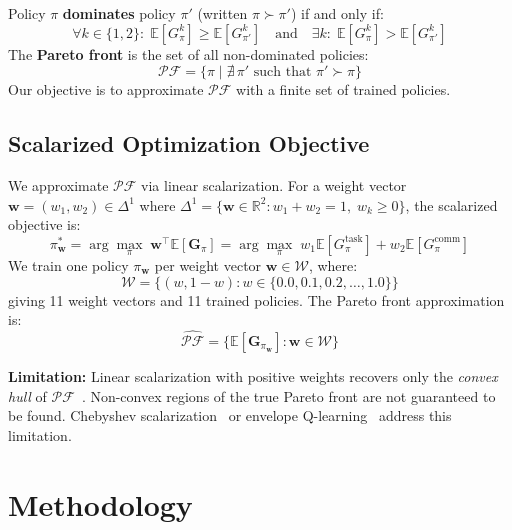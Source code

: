 \documentclass[runningheads]{llncs}
\newcommand{\E}{\mathbb{E}}
\newcommand{\R}{\mathbb{R}}
\newcommand{\PF}{\mathcal{PF}}
\newcommand{\W}{\mathcal{W}}
\newcommand{\bw}{\mathbf{w}}
\newcommand{\bG}{\mathbf{G}}
\begin{document}
Policy $\pi$ \textbf{dominates} policy $\pi'$ (written $\pi \succ \pi'$)
if and only if:
\begin{equation}
  \forall k \in \{1,2\}:\; \E[G^k_\pi] \geq \E[G^k_{\pi'}]
  \quad \text{and} \quad
  \exists k:\; \E[G^k_\pi] > \E[G^k_{\pi'}]
  \label{eq:dominance}
\end{equation}
The \textbf{Pareto front} is the set of all non-dominated policies:
\begin{equation}
  \PF = \{\pi \mid \nexists\, \pi' \text{ such that } \pi' \succ \pi\}
  \label{eq:pareto_front}
\end{equation}
Our objective is to approximate $\PF$ with a finite set of trained
policies.

\subsection{Scalarized Optimization Objective}

We approximate $\PF$ via linear scalarization.
For a weight vector $\bw = (w_1, w_2) \in \Delta^1$ where
$\Delta^1 = \{\bw \in \R^2 : w_1 + w_2 = 1,\; w_k \geq 0\}$,
the scalarized objective is:
\begin{equation}
  \pi^*_{\bw} = \arg\max_\pi\; \bw^\top \E[\bG_\pi]
  = \arg\max_\pi\; w_1 \E[G^\text{task}_\pi] + w_2 \E[G^\text{comm}_\pi]
  \label{eq:scalarized}
\end{equation}
We train one policy $\pi_{\bw}$ per weight vector $\bw \in \W$, where:
\begin{equation}
  \W = \{(w, 1-w) : w \in \{0.0, 0.1, 0.2, \ldots, 1.0\}\}
  \label{eq:weight_grid}
\end{equation}
giving 11 weight vectors and 11 trained policies.
The Pareto front approximation is:
\begin{equation}
  \hat{\PF} = \{\E[\bG_{\pi_{\bw}}] : \bw \in \W\}
  \label{eq:pf_approx}
\end{equation}

\textbf{Limitation:} Linear scalarization with positive weights
recovers only the \emph{convex hull} of $\PF$~\cite{das1997nonlinear}.
Non-convex regions of the true Pareto front are not guaranteed to be
found. Chebyshev scalarization~\cite{miettinen1999nonlinear} or
envelope Q-learning~\cite{yang2019generalized} address this limitation.

\section{Methodology}
\label{sec:method}
\end{document}
